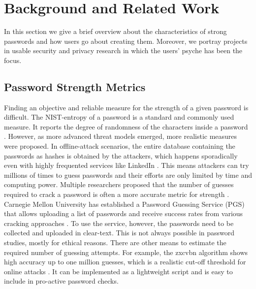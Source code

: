 \section{Background and Related Work}
In this section we give a brief overview about the characteristics of strong passwords and how users go about creating them. Moreover, we portray projects in usable security and privacy research in which the users' psyche has been the focus. 


\subsection{Password Strength Metrics}
Finding an objective and reliable measure for the strength of a given password is difficult. The NIST-entropy of a password is a standard and commonly used measure. It reports the degree of randomness of the characters inside a password \cite[ Appendix A therein]{Burr2011NIST}. However, as more advanced threat models emerged, more realistic measures were proposed. In offline-attack scenarios, the entire database containing the passwords as hashes is obtained by the attackers, which happens sporadically even with highly frequented services like LinkedIn \cite{Florencio2007DoStrongWebPasswords,Scott2016ProtectingLinkedIn,Shay2016DesigningPasswordPolicies}. This means attackers can try millions of times to guess passwords and their efforts are only limited by time and computing power. Multiple researchers proposed that the number of guesses required to crack a password is often a more accurate metric for strength \cite{Kelley20012GuessAgain, Shay2016DesigningPasswordPolicies, Weir2010MetricsPolicies}. Carnegie Mellon University has established a Password Guessing Service (PGS) that allows uploading a list of passwords and receive success rates from various cracking approaches \cite{Ur2015MeasuringRealWorldAccuracies}. To use the service, however, the passwords need to be collected and uploaded in clear-text. This is not always possible in password studies, mostly for ethical reasons. There are other means to estimate the required number of guessing attempts. For example, the zxcvbn algorithm shows high accuracy up to one million guesses, which is a realistic cut-off threshold for online attacks \cite{Wheeler2016zxcvbn}. It can be implemented as a lightweight script and is easy to include in pro-active password checks.

